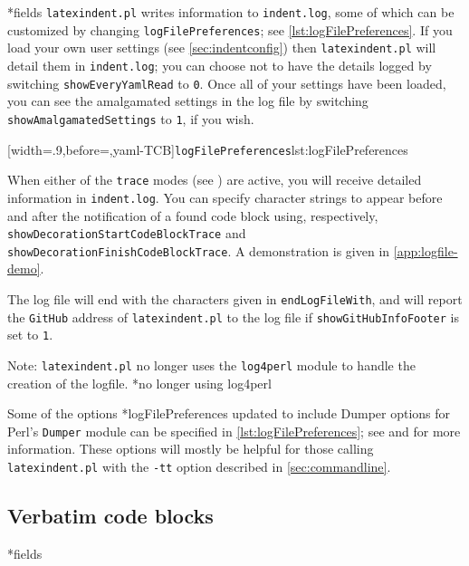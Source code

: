 *{fields}
	\texttt{latexindent.pl} writes information to \texttt{indent.log}, some
	of which can be customized by changing \texttt{logFilePreferences}; see
	\cref{lst:logFilePreferences}. If you load your own user settings (see
	\vref{sec:indentconfig}) then \texttt{latexindent.pl} will detail them in
	\texttt{indent.log}; you can choose not to have the details logged by switching
	\texttt{showEveryYamlRead} to \texttt{0}. Once all of your settings have been loaded, you
	can see the amalgamated settings in the log file by switching
	\texttt{showAmalgamatedSettings} to \texttt{1}, if you wish.

	[width=.9\linewidth,before=\centering,yaml-TCB]{\texttt{logFilePreferences}}{lst:logFilePreferences}

	When  either
	of the \texttt{trace} modes (see ) are active, you will
	receive detailed information in \texttt{indent.log}. You can specify character strings to
	appear before and after the notification of a found code block using, respectively,
	\texttt{showDecorationStartCodeBlockTrace} and
	\texttt{showDecorationFinishCodeBlockTrace}. A demonstration is given in
	\vref{app:logfile-demo}.%

	The log file will end with the characters given in \texttt{endLogFileWith}, and will
	report the \texttt{GitHub} address of \texttt{latexindent.pl} to the log file if
	\texttt{showGitHubInfoFooter} is set to \texttt{1}.

	Note: \texttt{latexindent.pl} no longer uses the \texttt{log4perl} module to handle the
	creation of the logfile. *{no longer using log4perl}%

	Some of the options *{logFilePreferences updated to include Dumper
	options} for Perl's \texttt{Dumper} module can be specified in
	\cref{lst:logFilePreferences}; see \cite{dumper} and \cite{dumperdemo} for more
	information. These options will mostly be helpful for those calling
	\texttt{latexindent.pl} with the \texttt{-tt} option described in \cref{sec:commandline}.%

\subsection{Verbatim code blocks}
*{fields}

